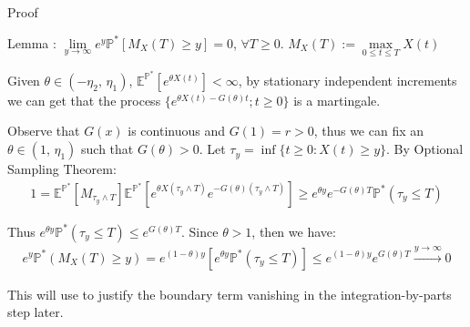 \documentclass{beamer}
\begin{document}
\begin{frame}{Proof}

    {\footnotesize \footnotesize
    \par Lemma :  \(\lim\limits_{y\to\infty}e^{y}\mathbb{P}^{*}[M_{X}(T)\geq y]=0\), \(\forall T\geq 0\). \(M_{X}(T):=\max\limits_{0\leq t\leq T}X(t)\)
    \par [Proof]
    \vspace{1em}
    \par Given \(\theta\in(-\eta_{2},\,\eta_{1})\), $\mathbb{E}^{\mathbb{P}^*}[e^{\theta X(t)}]<\infty$, 
    by stationary independent increments we can get that the process \(\{e^{\theta X(t)-G(\theta)t}; t\geq 0\}\) is a martingale.
     \vspace{1em}
    \par Observe that $G(x)$ is continuous and \(G(1)=r>0\), thus we can fix an \(\theta\in(1,\,\eta_{1})\) such that \(G(\theta)>0\).
     Let $\tau_y = \inf\{t \geq 0 : X(t) \geq y\}$. By Optional Sampling Theorem:
      \vspace{1em}
    \begin{align*}
      1 = \mathbb{E}^{\mathbb{P}^*}[M_{\tau_y \land T}]  \mathbb{E}^{\mathbb{P}^*} \left[ e^{\theta X(\tau_y \land T)} e^{-G(\theta)(\tau_y \land T)} \right] 
      \geq e^{\theta y} e^{-G(\theta)T} \mathbb{P}^* (\tau_y \leq T)
    \end{align*}
     \vspace{1em}
    \par Thus $e^{\theta y} \mathbb{P}^* (\tau_y \leq T) \leq e^{G(\theta)T}$. Since $\theta > 1$, then we have:
     \vspace{1em}
    \begin{align*}
      e^y \mathbb{P}^* (M_X(T) \geq y) = 
      e^{(1-\theta)y} \left[ e^{\theta y} \mathbb{P}^* (\tau_y \leq T) \right] \leq e^{(1-\theta)y} e^{G(\theta)T} \xrightarrow{y \to \infty} 0
    \end{align*}
    \par This will use to justify the boundary term vanishing in the integration-by-parts step later.
    }
    
\end{frame}
\end{document}
